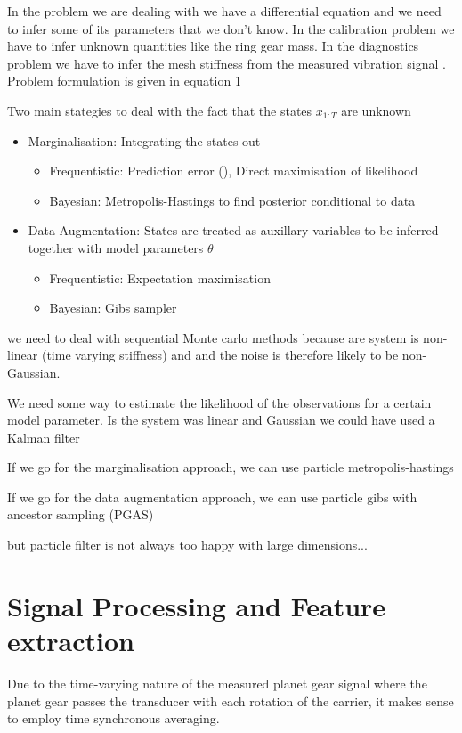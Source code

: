 In the problem we are dealing with we have a differential equation and we need to infer some of its parameters that we don't know. In the calibration problem we have to infer unknown quantities like the ring gear mass. In the diagnostics problem we have to infer the mesh stiffness from the measured vibration signal
\cite{Schon2015}. Problem formulation is given in equation 1

Two main stategies to deal with the fact that the states $x_{1:T}$ are unknown

\begin{itemize}
	\item Marginalisation: Integrating the states out
	 \begin{itemize}
		\item Frequentistic: Prediction error (), Direct maximisation of likelihood
		\item Bayesian: Metropolis-Hastings to find posterior conditional to data
	\end{itemize}

	\item Data Augmentation: States are treated as auxillary variables to be inferred together with model parameters $\theta$
	\begin{itemize}
		\item Frequentistic: Expectation maximisation
		\item Bayesian: Gibs sampler
	\end{itemize}
\end{itemize}

we need to deal with sequential Monte carlo methods because are system is non-linear (time varying stiffness) and and the noise is therefore likely to be non-Gaussian. 

We need some way to estimate the likelihood of the observations for a certain model parameter. Is the system was linear and Gaussian we could have used a Kalman filter 

If we go for the marginalisation approach, we can use particle metropolis-hastings 

If we go for the data augmentation approach, we can use particle gibs with ancestor sampling (PGAS)

but particle filter is not always too happy with large dimensions...



\section{Signal Processing and Feature extraction}
Due to the time-varying nature of the measured planet gear signal where the planet gear passes the transducer with each rotation of the carrier, it makes sense to employ time synchronous averaging. 

